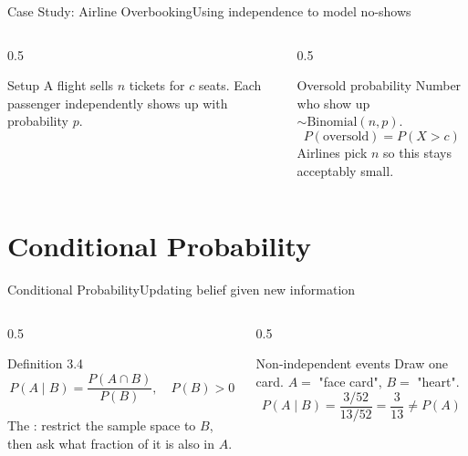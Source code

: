\documentclass[aspectratio=169,11pt]{beamer}
\begin{document}
\begin{frame}{Case Study: Airline Overbooking}{Using independence to model no-shows}
  \begin{columns}[T]
    \begin{column}{0.5\textwidth}
      \begin{block}{Setup}
        \small A flight sells $n$ tickets for $c$ seats. Each passenger
        independently shows up with probability $p$.
      \end{block}
    \end{column}
    \begin{column}{0.5\textwidth}
      \begin{exampleblock}{Oversold probability}
        \small Number who show up $\sim \text{Binomial}(n,p)$.
        \[ P(\text{oversold}) = P(X > c) \]
        \small Airlines pick $n$ so this stays acceptably small.
      \end{exampleblock}
    \end{column}
  \end{columns}
\end{frame}

\section{Conditional Probability}

\begin{frame}{Conditional Probability}{Updating belief given new information}
  \begin{columns}[T]
    \begin{column}{0.5\textwidth}
      \begin{block}{Definition 3.4}
        \[ P(A \mid B) = \frac{P(A \cap B)}{P(B)}, \quad P(B) > 0 \]
      \end{block}
      \small The : restrict the sample space to $B$,
      then ask what fraction of it is also in $A$.
    \end{column}
    \begin{column}{0.5\textwidth}
      \begin{exampleblock}{Non-independent events}
        \small Draw one card. $A=$ "face card", $B=$ "heart".
        \[ P(A\mid B) = \frac{3/52}{13/52} = \frac{3}{13} \ne P(A) \]
      \end{exampleblock}
    \end{column}
  \end{columns}
\end{frame}
\end{document}
